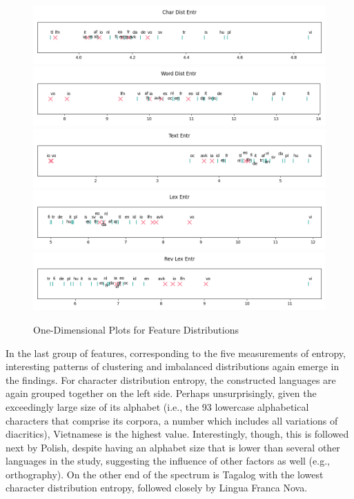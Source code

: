 \documentclass[12pt,a4paper]{article}
\numberwithin{figure}{section}
\numberwithin{table}{section}
\numberwithin{definition}{section}
\begin{document}
\clearpage

\begin{figure}[!ht]
  \centering
  \includegraphics[width=\textwidth]{1d_Char_Dist_Entr.png}
  \includegraphics[width=\textwidth]{1d_Word_Dist_Entr.png}
  \includegraphics[width=\textwidth]{1d_Text_Entr.png}
  \includegraphics[width=\textwidth]{1d_Lex_Entr.png}
  \includegraphics[width=\textwidth]{1d_Rev_Lex_Entr.png}
  \caption{One-Dimensional Plots for Feature Distributions}
  \label{fig:1dfeatures}
\end{figure}


In the last group of features, corresponding to the five measurements of entropy, interesting patterns of clustering and imbalanced distributions again emerge in the findings. For character distribution entropy, the constructed languages are again grouped together on the left side. Perhaps unsurprisingly, given the exceedingly large size of its alphabet (i.e., the 93 lowercase alphabetical characters that comprise its corpora, a number which includes all variations of diacritics), Vietnamese is the highest value. Interestingly, though, this is followed next by Polish, despite having an alphabet size that is lower than several other languages in the study, suggesting the influence of other factors as well (e.g., orthography). On the other end of the spectrum is Tagalog with the lowest character distribution entropy, followed closely by Lingua Franca Nova.
\end{document}
